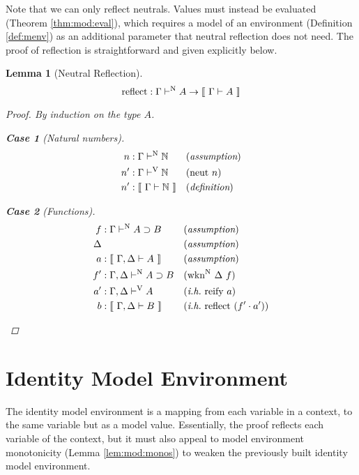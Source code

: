 \documentclass{llncs}
\newtheorem{sublemma}{Lemma}
\newtheorem{slcase}{Case}
\newcommand{\refdef}[1]{Definition \ref{def:#1}}
\newcommand{\refthm}[1]{Theorem \ref{thm:#1}}
\newcommand{\reflem}[1]{Lemma \ref{lem:#1}}
\def\arr{\supset}
\def\marr{\rightarrow}
\def\nat{\mathbb{N}}
\def\reflectn{\fun{reflect}}
\def\reflect{\reflectn}
\def\bydef{(\textit{definition})}
\def\byass{(\textit{assumption})}
\newcommand{\ih}[1]{(\textit{i.h.}~ #1)}
\newcommand{\by}[1]{(#1)}
\newcommand{\turn}[1]{\vdash^\con{#1}}
\newcommand{\el}[1]{\llbracket ~ #1 ~ \rrbracket}
\newcommand{\wknn}[1]{\fun{wkn}^\con{N} ~ \Delta ~ #1}
\newcommand{\con}[1]{\textmd{#1}}
\newcommand{\fun}[1]{\textmd{#1}}
\newcommand{\typm}[1]{\el{\Gamma \vdash #1}}
\newcommand{\gdtypm}[1]{\el{\Gamma, \Delta \vdash #1}}
\newcommand{\typv}[1]{\Gamma \turn{V} #1}
\newcommand{\gdtypv}[1]{\Gamma, \Delta \turn{V} #1}
\newcommand{\typn}[1]{\Gamma \turn{N} #1}
\newcommand{\gdtypn}[1]{\Gamma, \Delta \turn{N} #1}
\begin{document}
Note that we can only reflect neutrals. Values must instead be
evaluated (\refthm{mod:eval}), which requires a model of an
environment (\refdef{menv}) as an additional parameter that neutral reflection does
not need. The proof of reflection is straightforward and given explicitly
below. 

\begin{sublemma}[Neutral Reflection]
\label{lem:reflect}
$$
\reflect : \typn{A} \marr \typm{A}
$$

\begin{proof}

By induction on the type $A$.

\begin{slcase}[Natural numbers]
\begin{align*}
n  &: \typn{\nat} && \byass\\
n' &: \typv{\nat} && \by{\con{neut}~n}\\
n' &: \typm{\nat} && \bydef
\end{align*}
\end{slcase}

\begin{slcase}[Functions]
\begin{align*}
f &: \typn{A \arr B} && \byass\\
\Delta& && \byass\\
a  &: \gdtypm{A} && \byass\\
f' &: \gdtypn{A \arr B} && \by{\wknn{f}}\\
a' &: \gdtypv{A} && \ih{\fun{reify}~a}\\
b  &: \gdtypm{B} && \ih{\reflect~(f' \cdot a')}
\end{align*}
\end{slcase}

\end{proof}

\end{sublemma}


\section{Identity Model Environment}

The identity model environment is a mapping from each variable in a
context, to the same variable but as a model value. Essentially, the
proof reflects each variable of the context, but it must also appeal
to model environment monotonicity (\reflem{mod:monos}) to weaken the
previously built identity model environment.
\end{document}
